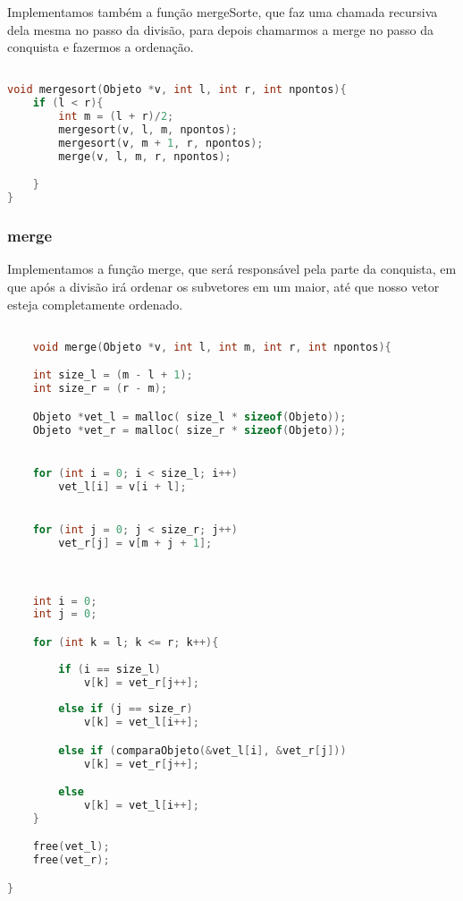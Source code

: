 \documentclass{article}
\begin{document}
Implementamos também a função mergeSorte, que faz uma chamada recursiva dela mesma
no passo da divisão, para depois chamarmos a merge no passo da conquista e fazermos a ordenação.

\begin{lstlisting}[caption={Função mergeSort},label={lst:cod7},language=C]

void mergesort(Objeto *v, int l, int r, int npontos){
    if (l < r){
        int m = (l + r)/2;
        mergesort(v, l, m, npontos);
        mergesort(v, m + 1, r, npontos);
        merge(v, l, m, r, npontos);

    }
}

\end{lstlisting}



\subsubsection{merge}

Implementamos a função merge, que será responsável pela parte da conquista, em que após a divisão
irá ordenar os subvetores em um maior, até que nosso vetor esteja completamente ordenado.

\begin{lstlisting}[caption={Função merge},label={lst:cod7},language=C]

    void merge(Objeto *v, int l, int m, int r, int npontos){

    int size_l = (m - l + 1);
    int size_r = (r - m);

    Objeto *vet_l = malloc( size_l * sizeof(Objeto));
    Objeto *vet_r = malloc( size_r * sizeof(Objeto));


    for (int i = 0; i < size_l; i++)
        vet_l[i] = v[i + l];


    for (int j = 0; j < size_r; j++)
        vet_r[j] = v[m + j + 1];



    int i = 0; 
    int j = 0;

    for (int k = l; k <= r; k++){
         
        if (i == size_l)
            v[k] = vet_r[j++];
        
        else if (j == size_r)
            v[k] = vet_l[i++];

        else if (comparaObjeto(&vet_l[i], &vet_r[j]))
            v[k] = vet_r[j++];

        else
            v[k] = vet_l[i++];
    }

    free(vet_l);
    free(vet_r);

}
    
\end{lstlisting}
    
\end{document}
